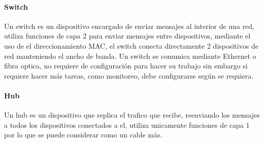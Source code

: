   \paragraph{Switch}
  Un switch es un dispositivo encargado de enviar mensajes al interior de una red, utiliza funciones de capa 2 para enviar mensajes entre
  dispositivos, mediante el uso de el direccionamiento MAC, el switch conecta directamente 2 dispositivos de red manteniendo el ancho de banda.\cite{cloudflare_switch}
  Un switch se comunica mediante Ethernet o fibra optica, no requiere de configuración para hacer su trabajo 
  sin embargo si requiere hacer más tareas, como monitoreo, debe configurarse según se requiera.
  \paragraph{Hub}
  Un hub es un dispositivo que replica el trafico que recibe, reenviando los mensajes a todos los dispositivos conectados a el,
  utiliza unicamente funciones de capa 1 por lo que se puede considerar como un cable más.
